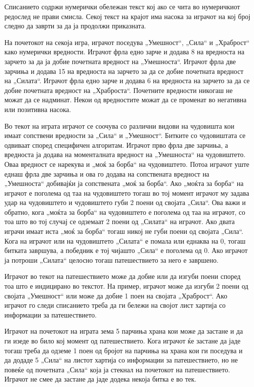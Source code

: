 Списанието содржи нумерички обележан текст кој ако се чита во нумеричкиот редослед не прави смисла. Секој текст на крајот има насока за играчот на кој број следно да заврти за да ја продолжи приказната.

На почетокот на секоја игра, играчот поседува „Умешност“, „Сила“ и „Храброст“ како нумерички вредности. Играчот фрла едно зарче и додава 8 на вредноста на зарчето за да ја добие почетната вредност на „Умешноста“. Играчот фрла две зарчиња и додава 15 на вредноста на зарчето за да се добие почетната вредност на „Силата“. Играчот фрла едно зарче и додава 6 на вредноста на зарчето за да се добие почетната вредност на „Храброста“. Почетните вредности никогаш не можат да се надминат. Некои од вредностите можат да се променат во негативна или позитивна насока.

Во текот на играта играчот се соочува со различни видови на чудовишта кои имаат сопствени вредности за „Сила“ и „Умешност“. Битките со чудовиштата се одвиваат според специфичен алгоритам. Играчот прво фрла две зарчиња, а вредноста ја додава на моменталната вредност на „Умешноста“ на чудовиштето. Оваа вредност се нарекува и „моќ за борба“ на чудовиштето. Потоа играчот уште еднаш фрла две зарчиња и ова го додава на сопствената вредност на „Умешноста“ добивајќи ја сопствената „моќ за борба“. Ако „моќта за борба“ на играчот е поголема од таа на чудовиштето тогаш во тој момент играчот му задава удар на чудовиштето и чудовиштето губи 2 поени од својата „Сила“. Ова важи и обратно, кога „моќта за борба“ на чудовиштето е поголема од таа на играчот, со тоа што во тој случај се одземаат 2 поени од „Силата“ на играчот. Ако двата играчи имаат иста „моќ за борба“ тогаш никој не губи поени од својата „Сила“. Кога на играчот или на чудовиштето „Силата“ е помала или еднаква на 0, тогаш битката завршува, а победник е тој чијашто „Сила“ е поголема од 0. Ако играчот ја потроши „Силата“ целосно тогаш патешествието за него е завршено.

Играчот во текот на патешествието може да добие или да изгуби поени според тоа што е индицирано во текстот. На пример, играчот може да изгуби 2 поени од својата „Умешност“ или може да добие 1 поен на својата „Храброст“. Ако играчот го следи списанието треба да ги бележи на својот лист хартија со информации за патешествието.

Играчот на почетокот на играта зема 5 парчиња храна кои може да застане и да ги изеде во било кој момент од патешествието. Кога играчот ќе застане да јаде тогаш треба да одземе 1 поен од бројот на парчиња на храна кои ги поседува и да додаде 5 „Сила“ на листот хартија со информации за патешествието, но не повеќе од почетната „Сила“ која ја стекнал на почетокот на патешествието. Играчот не смее да застане да јаде додека некоја битка е во тек.

